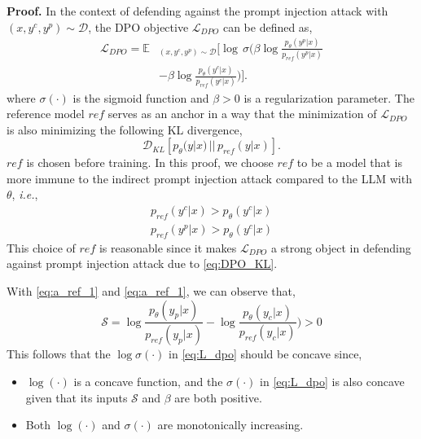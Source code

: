 \vspace{2mm}
\noindent\textbf{Proof.}
In the context of defending against the prompt injection attack with $(x,y^c,y^p)\sim \mathcal D$, the DPO objective $\mathcal L_{DPO}$ can be defined as,
%
\begin{equation}
  \begin{split} \label{eq:L_dpo}
    \mathcal L_{DPO} = \mathbb  E&_{(x,y^c,y^p)\sim \mathcal D} [ \log \,\sigma( \beta\log \frac{p_{\theta}(y^p|x)}{p_{ref}(y^p|x)} \\
    &-\beta\log \frac{p_{\theta}(y^c|x)}{p_{ref}(y^c|x)})].
  \end{split}
\end{equation}
%
where $\sigma(\cdot)$ is the sigmoid function and $\beta>0$ is a regularization parameter.
The reference model $ref$ serves as an anchor in a way that the minimization of $\mathcal L_{DPO}$ is also minimizing the following KL divergence,
%
\begin{equation} \label{eq:DPO_KL}
    \mathcal D_{KL} [p_{\theta}(y|x)\,||\,p_{ref}(y|x)].
\end{equation}
%
$ref$ is chosen before training. In this proof, we choose $ref$ to be a model that is more immune to the indirect prompt injection attack compared to the LLM with $\theta$, \emph{i.e.},
%
\begin{align} %
    p_{ref}(y^c|x) > p_{\theta}(y^c|x)  \label{eq:a_ref_1}\\
    p_{ref}(y^p|x) > p_{\theta}(y^c|x)   \label{eq:a_ref_2}
\end{align}
%
This choice of $ref$ is reasonable since it makes $\mathcal L_{DPO}$ a strong object in defending against prompt injection attack due to \eqref{eq:DPO_KL}.

\vspace{2mm}
\noindent With \eqref{eq:a_ref_1} and \eqref{eq:a_ref_1}, we can observe that,
%
\begin{equation} \label{eq:sigma_inputs}
    \mathcal S  = \log \frac{p_{\theta}(y_p|x)}{p_{ref}(y_p|x)} 
    -\log \frac{p_{\theta}(y_c|x)}{p_{ref}(y_c|x)}) > 0
\end{equation}
%
This follows that the $\log\sigma(\cdot)$ in \eqref{eq:L_dpo} should be concave since,
\begin{itemize}
    \item $\log(\cdot)$ is a concave function, and the $\sigma(\cdot)$  in \eqref{eq:L_dpo} is also concave given that its inputs $\mathcal S$ and $\beta$ are both positive.
    \item Both  $\log(\cdot)$ and  $\sigma(\cdot)$ are monotonically increasing.
\end{itemize}



